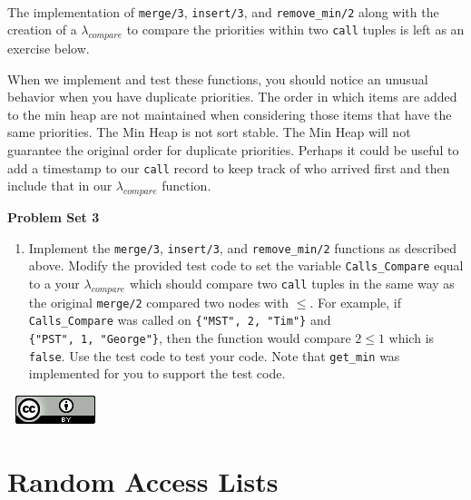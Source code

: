\documentclass[
]{book}
\providecommand{\tightlist}{%
  \setlength{\itemsep}{0pt}\setlength{\parskip}{0pt}}
\begin{document}
\(\nonumber\)

The implementation of \texttt{merge/3}, \texttt{insert/3}, and \texttt{remove\_min/2} along with the creation of a \(\lambda_{compare}\) to compare the priorities within two \texttt{call} tuples is left as an exercise below.

When we implement and test these functions, you should notice an unusual behavior when you have duplicate priorities. The order in which items are added to the min heap are not maintained when considering those items that have the same priorities. The Min Heap is not sort stable. The Min Heap will not guarantee the original order for duplicate priorities. Perhaps it could be useful to add a timestamp to our \texttt{call} record to keep track of who arrived first and then include that in our \(\lambda_{compare}\) function.

\begin{problembox}

\textbf{Problem Set 3}

\begin{enumerate}
\def\labelenumi{\arabic{enumi}.}
\tightlist
\item
  Implement the \texttt{merge/3}, \texttt{insert/3}, and \texttt{remove\_min/2} functions as described above. Modify the provided test code to set the variable \texttt{Calls\_Compare} equal to a your \(\lambda_{compare}\) which should compare two \texttt{call} tuples in the same way as the original \texttt{merge/2} compared two nodes with \(\leq\). For example, if \texttt{Calls\_Compare} was called on \texttt{\{"MST",\ 2,\ "Tim"\}} and \texttt{\{"PST",\ 1,\ "George"\}}, then the function would compare \(2 \leq 1\) which is \texttt{false}. Use the test code to test your code. Note that \texttt{get\_min} was implemented for you to support the test code.
\end{enumerate}

\end{problembox}

\(\nonumber\)
\(\nonumber\)
\href{http://creativecommons.org/licenses/by/4.0/}{\includegraphics{images/cc-88x31.png}}

\hypertarget{random-access-lists}{%
\chapter{Random Access Lists}\label{random-access-lists}}
\end{document}
